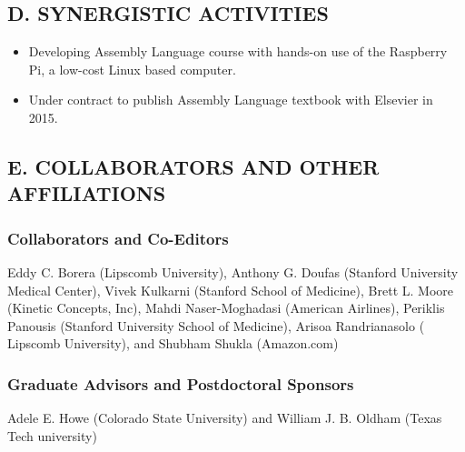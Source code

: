 \documentclass[11pt]{article}
\begin{document}
\subsection*{D. SYNERGISTIC ACTIVITIES}
\begin{itemize}
\item Developing Assembly Language course with hands-on use of the Raspberry Pi, a low-cost Linux based computer.
\item Under contract to publish Assembly Language textbook with Elsevier in
  2015.
\end{itemize}

\subsection*{E. COLLABORATORS AND OTHER AFFILIATIONS}
\subsubsection*{Collaborators  and Co-Editors}
Eddy C. Borera (Lipscomb University),
Anthony G. Doufas (Stanford University Medical Center), Vivek Kulkarni (Stanford School of Medicine), Brett L. Moore (Kinetic Concepts, Inc), Mahdi Naser-Moghadasi (American Airlines), Periklis Panousis (Stanford University School of Medicine), Arisoa Randrianasolo ( Lipscomb University), and Shubham Shukla (Amazon.com)

\subsubsection*{Graduate Advisors and Postdoctoral Sponsors}
Adele E. Howe (Colorado State University) and William J. B. Oldham (Texas Tech university)
\end{document}
